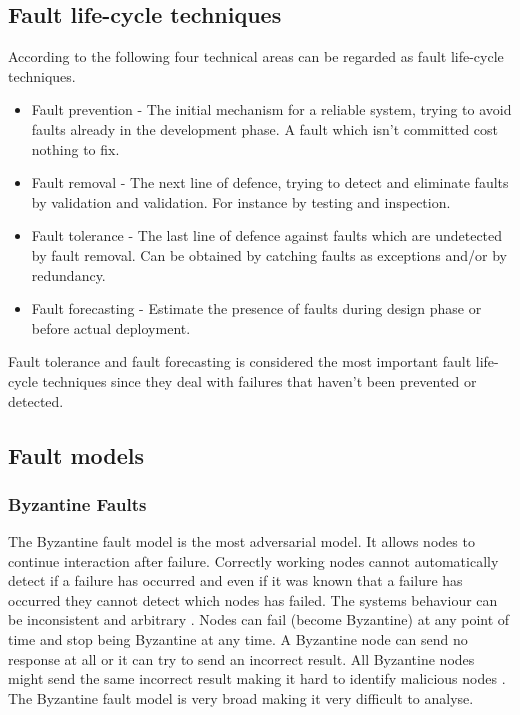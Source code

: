 \documentclass{cslthse-msc}
\begin{document}
\subsection{Fault life-cycle techniques}
According to \cite{softRelRoadmap} the following four technical areas can be regarded as fault life-cycle techniques.
\begin{itemize}
\item Fault prevention - The initial mechanism for a reliable system, trying to avoid faults already in the development phase. A fault which isn't committed cost nothing to fix. 
\item Fault removal - The next line of defence, trying to detect and eliminate faults by validation and validation. For instance by testing and inspection. 
\item Fault tolerance - The last line of defence against faults which are undetected by fault removal. Can be obtained by catching faults as exceptions and/or by redundancy.
\item Fault forecasting - Estimate the presence of faults during design phase or before actual deployment. 
\end{itemize}

Fault tolerance and fault forecasting is considered the most important fault life-cycle techniques since they deal with failures that haven't been prevented or detected. 

\subsection{Fault models}
\subsubsection*{Byzantine Faults}
The Byzantine fault model is the most adversarial model. It allows nodes to continue interaction after failure. Correctly working nodes cannot automatically detect if a failure has occurred and even if it was known that a failure has occurred they cannot detect which nodes has failed. The systems behaviour can be inconsistent and arbitrary \cite{surveyFaultParallel}. Nodes can fail (become Byzantine) at any point of time and stop being Byzantine at any time. A Byzantine node can send no response at all or it can try to send an incorrect result. All Byzantine nodes might send the same incorrect result making it hard to identify malicious nodes \cite{selfAdaptRel}. %
The Byzantine fault model is very broad making it very difficult to analyse.
\end{document}
